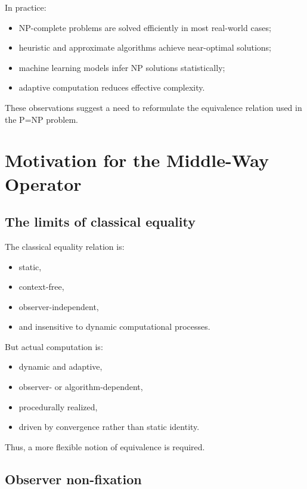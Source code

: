 \documentclass[12pt]{article}
\begin{document}
In practice:

\begin{itemize}
    \item NP-complete problems are solved efficiently in most real-world cases;
    \item heuristic and approximate algorithms achieve near-optimal solutions;
    \item machine learning models infer NP solutions statistically;
    \item adaptive computation reduces effective complexity.
\end{itemize}

These observations suggest a need to reformulate the equivalence relation 
used in the P=NP problem.

\section{Motivation for the Middle-Way Operator}

\subsection{The limits of classical equality}

The classical equality relation is:

\begin{itemize}
    \item static,
    \item context-free,
    \item observer-independent,
    \item and insensitive to dynamic computational processes.
\end{itemize}

But actual computation is:

\begin{itemize}
    \item dynamic and adaptive,
    \item observer- or algorithm-dependent,
    \item procedurally realized,
    \item driven by convergence rather than static identity.
\end{itemize}

Thus, a more flexible notion of equivalence is required.

\subsection{Observer non-fixation}
\end{document}
